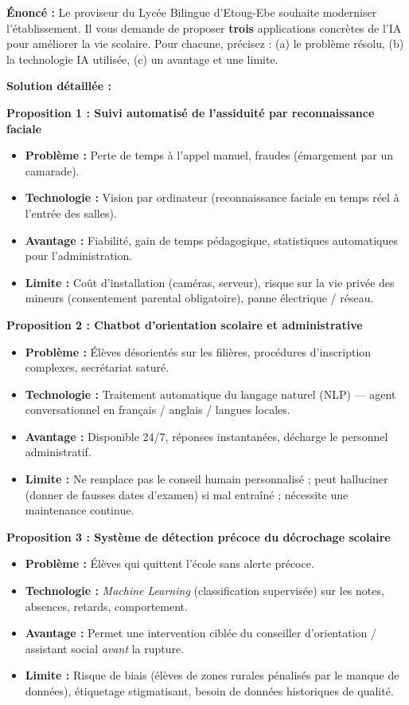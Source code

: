 \documentclass[11pt]{article}
\begin{document}
\begin{exoresolu}
\textbf{Énoncé :} Le proviseur du Lycée Bilingue d'Etoug-Ebe souhaite moderniser l'établissement. Il vous demande de proposer \textbf{trois} applications concrètes de l'IA pour améliorer la vie scolaire. Pour chacune, précisez : (a) le problème résolu, (b) la technologie IA utilisée, (c) un avantage et une limite.

\tcblower
\textbf{Solution détaillée :}

\textbf{Proposition 1 : Suivi automatisé de l'assiduité par reconnaissance faciale}
\begin{itemize}
    \item \textbf{Problème :} Perte de temps à l'appel manuel, fraudes (émargement par un camarade).
    \item \textbf{Technologie :} Vision par ordinateur (reconnaissance faciale en temps réel à l'entrée des salles).
    \item \textbf{Avantage :} Fiabilité, gain de temps pédagogique, statistiques automatiques pour l'administration.
    \item \textbf{Limite :} Coût d'installation (caméras, serveur), risque sur la vie privée des mineurs (consentement parental obligatoire), panne électrique / réseau.
\end{itemize}

\textbf{Proposition 2 : Chatbot d'orientation scolaire et administrative}
\begin{itemize}
    \item \textbf{Problème :} Élèves désorientés sur les filières, procédures d'inscription complexes, secrétariat saturé.
    \item \textbf{Technologie :} Traitement automatique du langage naturel (NLP) — agent conversationnel en français / anglais / langues locales.
    \item \textbf{Avantage :} Disponible 24/7, réponses instantanées, décharge le personnel administratif.
    \item \textbf{Limite :} Ne remplace pas le conseil humain personnalisé ; peut halluciner (donner de fausses dates d'examen) si mal entraîné ; nécessite une maintenance continue.
\end{itemize}

\textbf{Proposition 3 : Système de détection précoce du décrochage scolaire}
\begin{itemize}
    \item \textbf{Problème :} Élèves qui quittent l'école sans alerte précoce.
    \item \textbf{Technologie :} \emph{Machine Learning} (classification supervisée) sur les notes, absences, retards, comportement.
    \item \textbf{Avantage :} Permet une intervention ciblée du conseiller d'orientation / assistant social \emph{avant} la rupture.
    \item \textbf{Limite :} Risque de biais (élèves de zones rurales pénalisés par le manque de données), étiquetage stigmatisant, besoin de données historiques de qualité.
\end{itemize}


\end{exoresolu}
\end{document}

